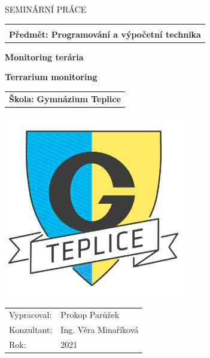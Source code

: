 \documentclass[a4paper,twoside,12pt]{book}
\newcommand{\tb}{\textbf} %
\newcommand{\cvut}{Gymnázium Teplice}
\newcommand{\ksi}{}
\newcommand{\obor}{Programování a výpočetní technika} %
\newcommand{\druh}{Seminární práce} %
\newcommand{\logoCVUT}{\includegraphics[height=8cm]{gympl}}  %
\newcommand{\nazevcz}{Monitoring terária}	%
\newcommand{\nazeven}{Terrarium monitoring}	%
\newcommand{\autor}{Prokop Parůžek}   %
\newcommand{\vedouci}{Ing. Věra Minaříková} %
\newcommand{\rok}{2021}  %
\begin{document}
\thispagestyle{empty}

\begin{center}
   {\Large \MakeUppercase{\druh}}
	\vspace{5mm}

	\begin{tabular}{c}
		\tb{\ksi} \\[3pt]   \tb{Předmět: \obor}\\
	\end{tabular}

	\vspace{10mm}
   {\huge \tb{\nazevcz}\par}
   \vspace{5mm}   {\huge \tb{\nazeven}\par}
   
   \vspace{10mm}
	 \begin{tabular}{c}
			 \LARGE{\tb{Škola:} \tb{\cvut}}
	\end{tabular}

   \vspace{10mm} \logoCVUT \vspace{15mm} 

   \vfill
   {\large
	\begin{tabular}{ll}
	Vypracoval: & \autor\\
	Konzultant: & \vedouci\\
	Rok: & \rok
	\end{tabular}
   }
\end{center}

\clearpage{\pagestyle{empty}\cleardoublepage} %


%
%
%
\end{document}
